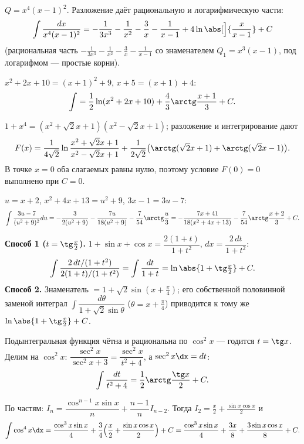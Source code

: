 \sol $Q=x^4(x-1)^2$. Разложение даёт рациональную и логарифмическую части:
\[
  \int\frac{dx}{x^4(x-1)^2}=-\frac{1}{3x^3}-\frac1{x^2}-\frac3x-\frac1{x-1}
   +4\ln\abs[\Big]{\frac{x}{x-1}}+C
\]
(рациональная часть $-\tfrac1{3x^3}-\tfrac1{x^2}-\tfrac3x-\tfrac1{x-1}$ со знаменателем
$Q_1=x^3(x-1)$, под логарифмом — простые корни).

\sol $x^2+2x+10=(x+1)^2+9$, $x+5=(x+1)+4$:
\[
  \int=\frac12\ln(x^2+2x+10)+\frac43\arctg\frac{x+1}{3}+C.
\]

\sol $1+x^4=(x^2+\sqrt2x+1)(x^2-\sqrt2x+1)$; разложение и интегрирование дают
\[
  F(x)=\frac1{4\sqrt2}\ln\frac{x^2+\sqrt2x+1}{x^2-\sqrt2x+1}
   +\frac1{2\sqrt2}\bigl(\arctg(\sqrt2x+1)+\arctg(\sqrt2x-1)\bigr).
\]
В точке $x=0$ оба слагаемых равны нулю, поэтому условие $F(0)=0$ выполнено при $C=0$.

\sol $u=x+2$, $x^2+4x+13=u^2+9$, $3x-1=3u-7$:
\[
  \int\frac{3u-7}{(u^2+9)^2}du=-\frac{3}{2(u^2+9)}-\frac{7u}{18(u^2+9)}-\frac7{54}\arctg\frac u3
  =-\frac{7x+41}{18(x^2+4x+13)}-\frac{7}{54}\arctg\frac{x+2}{3}+C.
\]

\sol \textbf{Способ 1 ($t=\tg\tfrac x2$).} $1+\sin x+\cos x=\dfrac{2(1+t)}{1+t^2}$, $dx=\dfrac{2\,dt}{1+t^2}$:
\[
  \int\frac{2\,dt/(1+t^2)}{2(1+t)/(1+t^2)}=\int\frac{dt}{1+t}=\ln\abs{1+\tg\tfrac x2}+C.
\]
\textbf{Способ 2.} Знаменатель $=1+\sqrt2\sin(x+\tfrac\pi4)$; его собственной половинной заменой
интеграл $\int\dfrac{d\theta}{1+\sqrt2\sin\theta}$ ($\theta=x+\tfrac\pi4$) приводится к тому же
$\ln\abs{1+\tg\tfrac x2}+C$.

\sol Подынтегральная функция чётна и рациональна по $\cos^2x$ — годится $t=\tg x$. Делим на
$\cos^2x$: $\dfrac{\sec^2x}{\sec^2x+3}=\dfrac{\sec^2x}{t^2+4}$, а $\sec^2x\dx=dt$:
\[
  \int\frac{dt}{t^2+4}=\frac12\arctg\frac{\tg x}{2}+C.
\]

\sol По частям: $I_n=\dfrac{\cos^{n-1}x\sin x}{n}+\dfrac{n-1}{n}I_{n-2}$. Тогда $I_2=\tfrac x2+\tfrac{\sin x\cos x}{2}$ и
\[
  \int\cos^4x\dx=\frac{\cos^3x\sin x}{4}+\frac34\Bigl(\frac x2+\frac{\sin x\cos x}{2}\Bigr)+C
  =\frac{\cos^3x\sin x}{4}+\frac{3x}{8}+\frac{3\sin x\cos x}{8}+C.
\]

